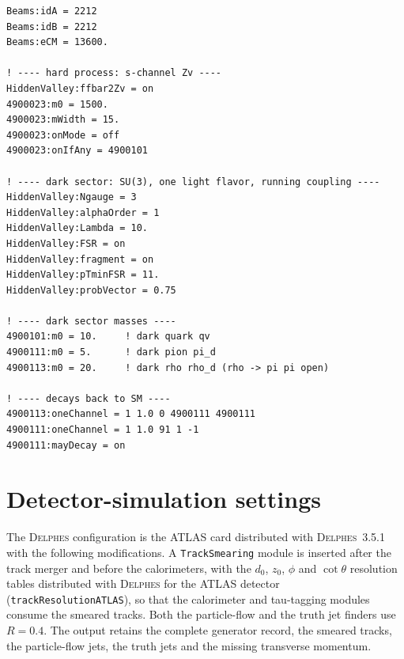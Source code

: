 \documentclass[a4paper,11pt]{article}
\newcommand{\dnought}{d_0}
\newcommand{\znought}{z_0}
\begin{document}
{\small
\begin{verbatim}
Beams:idA = 2212
Beams:idB = 2212
Beams:eCM = 13600.

! ---- hard process: s-channel Zv ----
HiddenValley:ffbar2Zv = on
4900023:m0 = 1500.
4900023:mWidth = 15.
4900023:onMode = off
4900023:onIfAny = 4900101

! ---- dark sector: SU(3), one light flavor, running coupling ----
HiddenValley:Ngauge = 3
HiddenValley:alphaOrder = 1
HiddenValley:Lambda = 10.
HiddenValley:FSR = on
HiddenValley:fragment = on
HiddenValley:pTminFSR = 11.
HiddenValley:probVector = 0.75

! ---- dark sector masses ----
4900101:m0 = 10.     ! dark quark qv
4900111:m0 = 5.      ! dark pion pi_d
4900113:m0 = 20.     ! dark rho rho_d (rho -> pi pi open)

! ---- decays back to SM ----
4900113:oneChannel = 1 1.0 0 4900111 4900111
4900111:oneChannel = 1 1.0 91 1 -1
4900111:mayDecay = on
\end{verbatim}
}

\section{Detector-simulation settings}
\label{app:delphes}

The \textsc{Delphes} configuration is the ATLAS card distributed with
\textsc{Delphes}~3.5.1 with the following modifications. A
\texttt{TrackSmearing} module is inserted after the track merger and
before the calorimeters, with the $\dnought$, $\znought$, $\phi$ and
$\cot\theta$ resolution tables distributed with \textsc{Delphes} for the
ATLAS detector (\texttt{trackResolutionATLAS}), so that the calorimeter and tau-tagging modules consume the smeared
tracks. Both the particle-flow and the truth jet finders use
$R = 0.4$. The output retains the complete generator record, the
smeared tracks, the particle-flow jets, the truth jets and the missing
transverse momentum.
\end{document}
